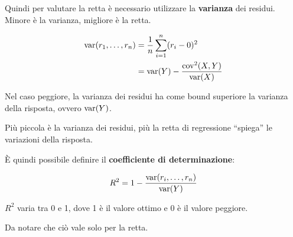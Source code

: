 Quindi per valutare la retta è necessario utilizzare la
\textbf{varianza} dei residui. Minore è la varianza, migliore è la
retta.

\begin{align*}
	\text{var}(r_1, \ldots, r_n) &= \frac{1}{n} \sum\limits_{i=1}^{n} (r_{i} - 0)^2 \\
									  &= \text{var}(Y) - \frac{\text{cov}^2(X,Y)}{\text{var}(X)}
\end{align*}

Nel caso peggiore, la varianza dei residui ha come bound superiore la
varianza della risposta, ovvero $\text{var}(Y)$.

Più piccola è la varianza dei residui, più la retta di regressione ``spiega'' le variazioni della risposta.

È quindi possibile definire il \textbf{coefficiente di determinazione}:

$$
R^2 = 1 - \frac{\text{var}(r_i, \ldots, r_n)}{\text{var}(Y)}
$$

$R^2$ varia tra 0 e 1, dove 1 è il valore ottimo e 0 è il valore
peggiore.

Da notare che ciò vale solo per la retta.
